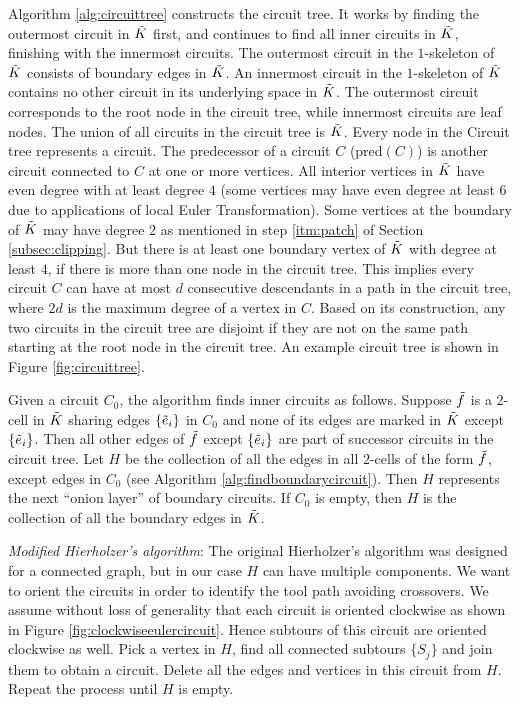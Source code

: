 Algorithm \ref{alg:circuittree} constructs the circuit tree.
It works by finding the outermost circuit in $\tilde{K}$ first, and continues to find all inner circuits in $\tilde{K}$, finishing with the innermost circuits.
The outermost circuit in the $1$-skeleton of $\tilde{K}$ consists of boundary edges in $\tilde{K}$.
An innermost circuit in the $1$-skeleton of $\tilde{K}$ contains no other circuit in its underlying space in $\tilde{K}$.  
The outermost circuit corresponds to the root node in the circuit tree, while innermost circuits are leaf nodes.
The union of all circuits in the circuit tree is $\tilde{K}$.
Every node in the Circuit tree represents a circuit.
The predecessor of a circuit $C$ (pred$(C)$) is another circuit connected to $C$ at one or more vertices.
All interior vertices in $\tilde{K}$ have even degree with at least degree $4$ (some vertices may have even degree at least $6$ due to applications of local Euler Transformation).
Some vertices at the boundary of $\tilde{K}$ may have degree $2$ as mentioned in step \ref{itm:patch} of Section \ref{subsec:clipping}.
But there is at least one boundary vertex of $\tilde{K}$ with degree at least $4$, if there is more than one node in the circuit tree.
This implies every circuit $C$ can have at most $d$ consecutive descendants in a path in the circuit tree, where $2d$ is the maximum degree of a vertex in $C$.
Based on its construction, any two circuits in the circuit tree are disjoint if they are not on the same path starting at the root node in the circuit tree.
An example circuit tree is shown in Figure \ref{fig:circuittree}.

\medskip
Given a circuit $C_0$, the algorithm finds inner circuits as follows.
Suppose $\tilde{f}$ is a $2$-cell in $\tilde{K}$ sharing edges $\{\tilde{e}_i\}$ in $C_0$ and none of its edges are marked in $\tilde{K}$ except $\{\tilde{e}_i\}$.
Then all other edges of $\tilde{f}$ except $\{\tilde{e}_i\}$ are part of successor circuits in the circuit tree.
Let $H$ be the collection of all the edges in all $2$-cells of the form $\tilde{f}$, except edges in $C_0$ (see Algorithm \ref{alg:findboundarycircuit}).
Then $H$ represents the next ``onion layer'' of boundary circuits.
If $C_0$ is empty, then $H$ is the  collection of all the boundary edges in $\tilde{K}$.

\smallskip
\noindent \textit{Modified Hierholzer's algorithm}: The original Hierholzer's algorithm \cite{HiWi1873} was designed for a connected graph, but in our case $H$ can have multiple components.
We want to orient the circuits in order to identify the tool path avoiding crossovers.
We assume without loss of generality that each circuit is oriented clockwise as shown in Figure \ref{fig:clockwiseeulercircuit}.
Hence subtours of this circuit are oriented clockwise as well.
Pick a vertex in $H$, find all connected subtours $\{S_j\}$ and join them to obtain a circuit.
Delete all the edges and vertices in this circuit from $H$.
Repeat the process until $H$ is empty.

